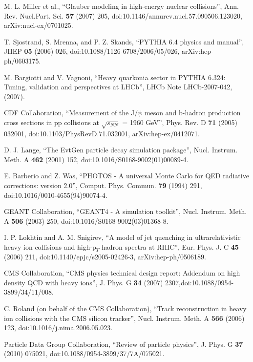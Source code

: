 \begin{thebibliography}{999}
 M. L. Miller et al., ``Glauber modeling in high-energy nuclear collisions'', Ann. Rev. Nucl.Part. Sci. {\bf 57} (2007) 205, 
doi:10.1146/annurev.nucl.57.090506.123020, arXiv:nucl-ex/0701025.

 T. Sjostrand, S. Mrenna, and P. Z. Skands, ``PYTHIA 6.4 physics and manual'', JHEP {\bf 05} (2006) 026, 
doi:10.1088/1126-6708/2006/05/026, arXiv:hep-ph/0603175.

 M. Bargiotti and V. Vagnoni, ``Heavy quarkonia sector in PYTHIA 6.324: Tuning, validation and perspectives at LHCb'', 
LHCb Note LHCb-2007-042, (2007).

CDF Collaboration, ``Measurement of the J/$\psi$ meson and b-hadron production cross sections in pp collisions at 
$\surd{s_{NN}}$ = 1960 GeV'', Phys. Rev. D {\bf 71} (2005) 032001, doi:10.1103/PhysRevD.71.032001, arXiv:hep-ex/0412071.

 D. J. Lange, ``The EvtGen particle decay simulation package'', Nucl. Instrum. Meth. A {\bf 462} (2001) 152, 
doi:10.1016/S0168-9002(01)00089-4.


 E. Barberio and Z. Was, ``PHOTOS - A universal Monte Carlo for QED radiative corrections: version 2.0'', 
Comput. Phys. Commun. {\bf 79} (1994) 291, doi:10.1016/0010-4655(94)90074-4.

 GEANT Collaboration, ``GEANT4 - A simulation toolkit'', Nucl. Instrum. Meth. A {\bf 506} (2003) 250, 
doi:10.1016/S0168-9002(03)01368-8.


 I. P. Lokhtin and A. M. Snigirev, ``A model of jet quenching in ultrarelativistic heavy ion
collisions and high-p$_T$ hadron spectra at RHIC'', Eur. Phys. J. C {\bf 45} (2006) 211, doi:10.1140/epjc/s2005-02426-3, 
arXiv:hep-ph/0506189.

 CMS Collaboration, ``CMS physics technical design report: Addendum on high density
QCD with heavy ions'', J. Phys. G {\bf 34} (2007) 2307,doi:10.1088/0954-3899/34/11/008.


 C. Roland (on behalf of the CMS Collaboration), ``Track reconstruction in heavy ion
collisions with the CMS silicon tracker'', Nucl. Instrum. Meth. A {\bf 566} (2006) 123, doi:10.1016/j.nima.2006.05.023.

 Particle Data Group Collaboration, ``Review of particle physics'', J. Phys. G {\bf 37} (2010) 075021, 
 doi:10.1088/0954-3899/37/7A/075021.


\end{thebibliography}
